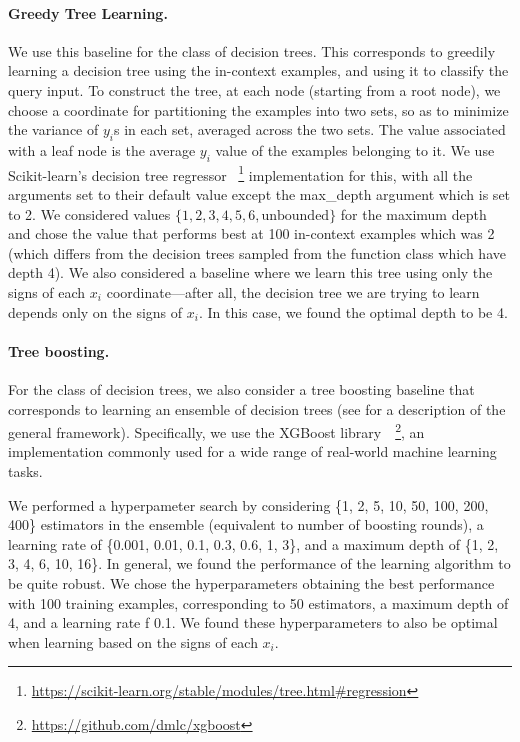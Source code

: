 \paragraph{Greedy Tree Learning.} We use this baseline for the class of decision trees. This corresponds to greedily learning a decision tree using the in-context examples, and using it to classify the query input. To construct the tree, at each node (starting from a root node), we choose a coordinate for partitioning the examples into two sets, so as to minimize the variance of $y_i$s in each set, averaged across the two sets. The value associated with a leaf node is the average $y_i$ value of the examples belonging to it. We use Scikit-learn's decision tree regressor \citep{scikit-learn}
~\footnote{\scriptsize\url{https://scikit-learn.org/stable/modules/tree.html\#regression}} implementation for this, with all the arguments set to their default value except the max\_depth argument which is set to 2. 
We considered values $\{1, 2, 3, 4, 5, 6, \text{unbounded}\}$ for the maximum depth and chose the value that performs best at 100 in-context examples which was 2 (which differs from the decision trees sampled from the function class which have depth 4).
We also considered a baseline where we learn this tree using only the signs of each $x_i$ coordinate---after all, the decision tree we are trying to learn depends only on the signs of $x_i$.
In this case, we found the optimal depth to be 4.
 
\paragraph{Tree boosting.} For the class of decision trees, we also consider a tree boosting baseline that corresponds to learning an ensemble of decision trees (see \citet{friedman2001greedy} for a description of the general framework).
Specifically, we use the XGBoost library~\citep{chen2016xgboost}~\footnote{\scriptsize\url{https://github.com/dmlc/xgboost}}, an implementation commonly used for a wide range of real-world machine learning tasks.

We performed a hyperpameter search by considering \{1, 2, 5, 10, 50, 100, 200, 400\} estimators in the ensemble (equivalent to number of boosting rounds), a learning rate of \{0.001, 0.01, 0.1, 0.3, 0.6, 1, 3\}, and a maximum depth of \{1, 2, 3, 4, 6, 10, 16\}.
In general, we found the performance of the learning algorithm to be quite robust.
We chose the hyperparameters obtaining the best performance with 100 training examples, corresponding to 50 estimators, a maximum depth of 4, and a learning rate f 0.1.
We found these hyperparameters to also be optimal when learning based on the signs of each $x_i$.

